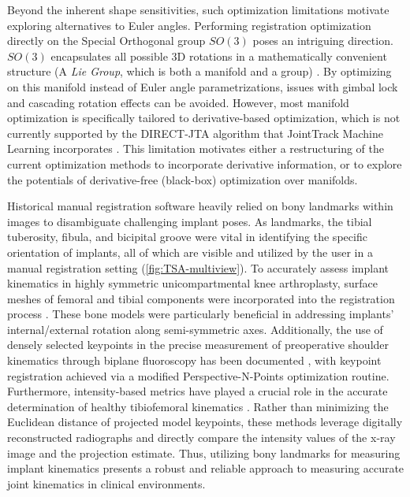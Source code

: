 Beyond the inherent shape sensitivities, such optimization limitations motivate exploring alternatives to Euler angles.
Performing registration optimization directly on the Special Orthogonal group $SO(3)$ poses an intriguing direction.
$SO(3)$ encapsulates all possible 3D rotations in a mathematically convenient structure (A \emph{Lie Group}, which is both a manifold and a group) \cite{zillerLieGroupsRepresentation2010,serreLieAlgebrasLie1992}.
By optimizing on this manifold instead of Euler angle parametrizations, issues with gimbal lock and cascading rotation effects can be avoided.
However, most manifold optimization is specifically tailored to derivative-based optimization, which is not currently supported by the DIRECT-JTA algorithm that JointTrack Machine Learning incorporates \cite{jensenJointTrackMachine2023,jonesLipschitzianOptimizationLipschitz1993,floodAutomatedRegistration3D2018}.
This limitation motivates either a restructuring of the current optimization methods to incorporate derivative information, or to explore the potentials of derivative-free (black-box) optimization \cite{audetDerivativeFreeBlackboxOptimization2017} over manifolds.


Historical manual registration software heavily relied on bony landmarks within images to disambiguate challenging implant poses.
As landmarks, the tibial tuberosity, fibula, and bicipital groove were vital in identifying the specific orientation of implants, all of which are visible and utilized by the user in a manual registration setting (\cref{fig:TSA-multiview}).
To accurately assess implant kinematics in highly symmetric unicompartmental knee arthroplasty, surface meshes of femoral and tibial components were incorporated into the registration process \cite{banksComparingVivoKinematics2005}.
These bone models were particularly beneficial in addressing implants' internal/external rotation along semi-symmetric axes.
Additionally, the use of densely selected keypoints in the precise measurement of preoperative shoulder kinematics through biplane fluoroscopy has been documented \cite{burtonFullyAutomaticTracking2023}, with keypoint registration achieved via a modified Perspective-N-Points optimization routine.
Furthermore, intensity-based metrics have played a crucial role in the accurate determination of healthy tibiofemoral kinematics \cite{bakaStatisticalShapeModelBased2012}.
Rather than minimizing the Euclidean distance of projected model keypoints, these methods leverage digitally reconstructed radiographs and directly compare the intensity values of the x-ray image and the projection estimate.
Thus, utilizing bony landmarks for measuring implant kinematics presents a robust and reliable approach to measuring accurate joint kinematics in clinical environments.

